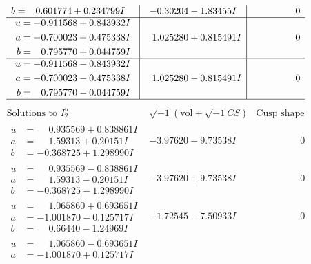 \documentclass[1p]{elsarticle_modified}
\theoremstyle{definition}
\newcommand{\I}{\sqrt{-1}}
\begin{document}
$$\begin{array}{c|c|c}
\begin{aligned}
b &= \phantom{-}0.601774 + 0.234799 I\end{aligned}
 & -0.30204 - 1.83455 I & \phantom{-0.000000 } 0 \\ \hline\begin{aligned}
u &= -0.911568 + 0.843932 I \\
a &= -0.700023 + 0.475338 I \\
b &= \phantom{-}0.795770 + 0.044759 I\end{aligned}
 & \phantom{-}1.025280 + 0.815491 I & \phantom{-0.000000 } 0 \\ \hline\begin{aligned}
u &= -0.911568 - 0.843932 I \\
a &= -0.700023 - 0.475338 I \\
b &= \phantom{-}0.795770 - 0.044759 I\end{aligned}
 & \phantom{-}1.025280 - 0.815491 I & \phantom{-0.000000 } 0\\
 \hline 
 \end{array}$$\newpage$$\begin{array}{c|c|c}  
\text{Solutions to }I^u_{2}& \I (\text{vol} + \sqrt{-1}CS) & \text{Cusp shape}\\
 \hline 
\begin{aligned}
u &= \phantom{-}0.935569 + 0.838861 I \\
a &= \phantom{-}1.59313 + 0.20151 I \\
b &= -0.368725 + 1.298990 I\end{aligned}
 & -3.97620 - 9.73538 I & \phantom{-0.000000 } 0 \\ \hline\begin{aligned}
u &= \phantom{-}0.935569 - 0.838861 I \\
a &= \phantom{-}1.59313 - 0.20151 I \\
b &= -0.368725 - 1.298990 I\end{aligned}
 & -3.97620 + 9.73538 I & \phantom{-0.000000 } 0 \\ \hline\begin{aligned}
u &= \phantom{-}1.065860 + 0.693651 I \\
a &= -1.001870 - 0.125717 I \\
b &= \phantom{-}0.66440 - 1.24969 I\end{aligned}
 & -1.72545 - 7.50933 I & \phantom{-0.000000 } 0 \\ \hline\begin{aligned}
u &= \phantom{-}1.065860 - 0.693651 I \\
a &= -1.001870 + 0.125717 I \\

\end{aligned}
\end{array}$$
\end{document}
